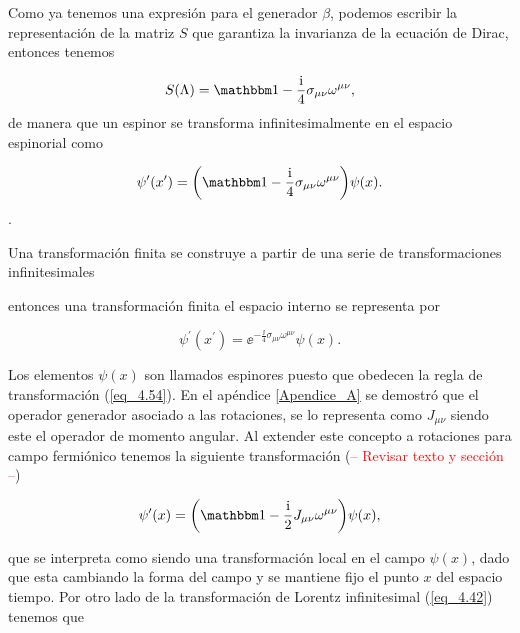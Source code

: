 Como ya tenemos una expresión para el generador $\beta$, podemos escribir la representación de la matriz $S$ que garantiza la invarianza de la ecuación de Dirac, entonces tenemos

\begin{equation}
	S(\Lambda) =\idnt- \frac{\ii}{4} \sigma_{\mu \nu} \omega^{\mu \nu} ,
\end{equation}
de manera que un espinor se transforma infinitesimalmente en el espacio espinorial como

\begin{equation}
	\psi^\prime(x^\prime) = \qty( \idnt- \frac{\ii}{4} \sigma_{\mu \nu} \omega^{\mu \nu} ) \psi(x).
	\label{eq_4.53} 
\end{equation}.

Una transformación finita se construye a partir de una serie de transformaciones infinitesimales 


entonces una transformación finita el espacio interno se representa por

\begin{equation}
	\boxed{ \psi^\prime(x^\prime) = \ee^{-\frac{\ii}{4} \sigma_{\mu \nu} \omega^{\mu \nu} } \psi(x) . }
	\label{eq_4.54}
\end{equation}

Los elementos $\psi(x)$ son llamados espinores puesto que obedecen la regla de transformación (\ref{eq_4.54}). En el apéndice \ref{Apendice_A} se demostró que el operador generador asociado a las rotaciones, se lo representa como $J_{\mu \nu}$ siendo este el operador de momento angular. Al extender este concepto a rotaciones para campo fermiónico tenemos la siguiente transformación (\textcolor{red}{-- Revisar texto y sección --})

\begin{equation}
	\psi^\prime (x) = \qty(\idnt - \frac{\ii}{2} J_{\mu \nu} \omega^{\mu \nu} ) \psi(x),
	\label{eq_4.55}
\end{equation}

que se interpreta como siendo una transformación local en el campo $\psi(x)$, dado que esta cambiando la forma del campo y se mantiene fijo el punto $x$ del espacio tiempo. Por otro lado de la transformación de Lorentz infinitesimal (\ref{eq_4.42}) tenemos que 

